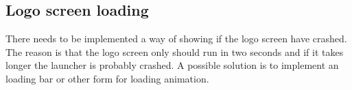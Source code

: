 \subsection{Logo screen loading}
\label{backlog:logo_screen_loading}
There needs to be implemented a way of showing if the logo screen have crashed. The reason is that the logo screen only should run in two seconds and if it takes longer the launcher is probably crashed. 
A possible solution is to implement an loading bar or other form for loading animation.

